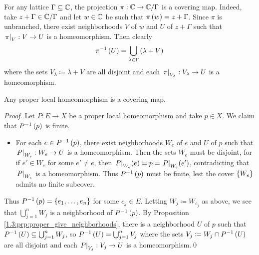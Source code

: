 \documentclass[../Moduli_Spaces_of_Riemann_Surfaces.tex]{subfiles}
\begin{document}
    \begin{example}
        For any lattice $\Gamma\subseteq\mathbb{C}$, the projection $\pi:\mathbb{C}\to\mathbb{C}/\Gamma$ is a covering map. Indeed, take $z+\Gamma\in\mathbb{C}/\Gamma$ and let $w\in\mathbb{C}$ be such that $\pi\left(w\right)=z+\Gamma$. Since $\pi$ is unbranched, there exist neighborhoods $V$ of $w$ and $U$ of $z+\Gamma$ such that $\left.\pi\right|_{V}:V\to U$ is a homeomorphism. Then clearly
        \begin{equation*}
            \pi^{-1}\left(U\right)=\bigcup_{\lambda\in\Gamma}\left(\lambda+V\right)
        \end{equation*}
        where the sets $V_\lambda\coloneqq\lambda+V$ are all disjoint and each $\left.\pi\right|_{V_\lambda}:V_\lambda\to U$ is a homeomorphism.\exqed
    \end{example}
    \begin{proposition}\label{2.1:prp:proper_local_covering}
        Any proper local homeomorphism is a covering map.
    \end{proposition}
    \begin{proof}
        Let $P:E\to X$ be a proper local homeomorphism and take $p\in X$. We claim that $P^{-1}\left(p\right)$ is finite.
        \begin{itemize}
            \item For each $e\in P^{-1}\left(p\right)$, there exist neighborhoods $W_e$ of $e$ and $U$ of $p$ such that $\left.P\right|_{W_e}:W_e\to U$ is a homeomorphism. Then the sets $W_e$ must be disjoint, for if $e'\in W_e$ for some $e'\neq e$, then $\left.P\right|_{W_e}\!\left(e\right)=p=\left.P\right|_{W_e}\!\left(e'\right)$, contradicting that $\left.P\right|_{W_e}$ is a homeomorphism. Thus $P^{-1}\left(p\right)$ must be finite, lest the cover $\left\{W_e\right\}$ admits no finite subcover.
        \end{itemize}
        Thus $P^{-1}\left(p\right)=\left\{e_1,\dots,e_n\right\}$ for some $e_j\in E$. Letting $W_j\coloneqq W_{e_j}$ as above, we see that $\bigcup_{j=1}^{n}W_j$ is a neighborhood of $P^{-1}\left(p\right)$. By Proposition \ref{1.3:prp:proper_give_neighborhoods}, there is a neighborhood $U$ of $p$ such that $P^{-1}\left(U\right)\subseteq\bigcup_{j=1}^{n}W_j$, so $P^{-1}\left(U\right)=\bigcup_{j=1}^{n}V_j$ where the sets $V_j\coloneqq W_j\cap P^{-1}\left(U\right)$ are all disjoint and each $\left.P\right|_{V_j}:V_j\to U$ is a homeomorphism.\qed
    \end{proof}
\end{document}
